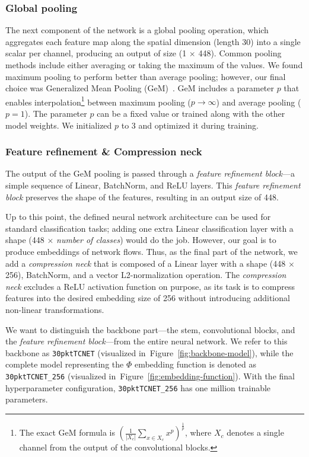 \documentclass[lettersize,journal,twoside,article]{IEEEtran}
\newcommand{\figref}[1]{Figure~\ref{#1}}
\begin{document}
\subsubsection{Global pooling}
The next component of the network is a global pooling operation, which aggregates each feature map along the spatial dimension (length 30) into a single scalar per channel, producing an output of size (1 $\times$ 448). Common pooling methods include either averaging or taking the maximum of the values. We found maximum pooling to perform better than average pooling; however, our final choice was Generalized Mean Pooling (GeM)~\cite{Radenovic2018GeM}. GeM includes a parameter $p$ that enables interpolation\footnote{The exact GeM formula is $\left( \frac{1}{|X_c|} \sum\limits_{x \in X_c} x^p \right)^{\frac{1}{p}}$, where $X_c$ denotes a single channel from the output of the convolutional blocks.} between maximum pooling ($p \to \infty$) and average pooling ($p = 1$). The parameter $p$ can be a fixed value or trained along with the other model weights. We initialized $p$ to 3 and optimized it during training.

\subsubsection{Feature refinement \& Compression neck}
The output of the GeM pooling is passed through a \textit{feature refinement block}---a simple sequence of Linear, BatchNorm, and ReLU layers. This \textit{feature refinement block} preserves the shape of the features, resulting in an output size of 448.

Up to this point, the defined neural network architecture can be used for standard classification tasks; adding one extra Linear classification layer with a shape (448 $\times$ \textit{number of classes}) would do the job. However, our goal is to produce embeddings of network flows. Thus, as the final part of the network, we add a \textit{compression neck} that is composed of a Linear layer with a shape (448 $\times$ 256), BatchNorm, and a vector L2-normalization operation. The \textit{compression neck} excludes a ReLU activation function on purpose, as its task is to compress features into the desired embedding size of 256 without introducing additional non-linear transformations. 

We want to distinguish the backbone part---the stem, convolutional blocks, and the \textit{feature refinement block}---from the entire neural network. We refer to this backbone as \texttt{30pktTCNET} (visualized in~\figref{fig:backbone-model}), while the complete model representing the $\Phi$ embedding function is denoted as \texttt{30pktTCNET\_256} (visualized in~\figref{fig:embedding-function}). With the final hyperparameter configuration, \texttt{30pktTCNET\_256} has one million trainable parameters.
\end{document}
